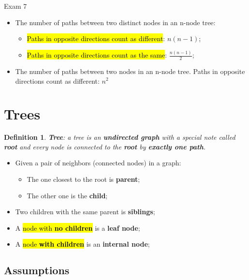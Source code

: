 \documentclass{note}
\newtheorem{definition}{Definition}
\begin{document}
\begin{note}{Exam 7}
    \begin{itemize}
        \item The number of paths between two distinct nodes in an n-node tree:
        \begin{itemize}
            \item \hl{Paths in opposite directions count as different}: $ n \left( n - 1 \right) $;
            \item \hl{Paths in opposite directions count as the same}: $ \frac{n \left( n - 1 \right)}{2} $;
        \end{itemize}

        \item The number of paths between two nodes in an n-node tree. Paths in opposite directions count as different: $ n^{2} $ 
        
    \end{itemize}

\newpage

\section{Trees}

\begin{definition}
    \textbf{Tree}: a tree is an \textbf{undirected graph} with a special note called \textbf{root} and every node is connected to the
    \textbf{root} by \textbf{exactly one path}.
\end{definition}

\begin{itemize}
    \item Given a pair of neighbors (connected nodes) in a graph:
    \begin{itemize}
        \item The one closest to the root is \textbf{parent};
        \item The other one is the \textbf{child};
    \end{itemize}
    \item Two children with the same parent is \textbf{siblings};
    \item A \hl{node with \textbf{no children}} is a \textbf{leaf node};
    \item A \hl{node \textbf{with children}} is an \textbf{internal node};
\end{itemize}

    \subsection{Assumptions}


\end{note}
\end{document}
